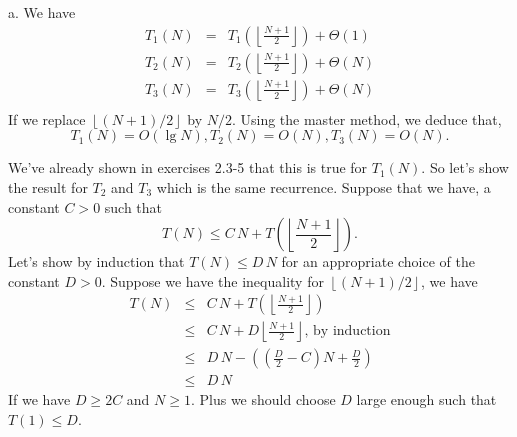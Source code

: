 \documentclass[a4paper,12pt]{article}
\newcommand{\subpar}[1]{\medskip \noindent #1.}
\begin{document}
\subpar{a}  We have
\begin{eqnarray*}
 T_1(N) &=& T_1\left(\left\lfloor \frac{N+1}{2}\right\rfloor\right) +
\Theta(1) \\
 T_2(N) &=& T_2\left(\left\lfloor \frac{N+1}{2}\right\rfloor\right) +
\Theta(N) \\
 T_3(N) &=& T_3\left(\left\lfloor \frac{N+1}{2}\right\rfloor\right) +
\Theta(N) \\
\end{eqnarray*}
If we replace $\left\lfloor (N+1)/2\right\rfloor$ by $N/2$.  Using the
master method, we deduce that,
\[ T_1(N) = O(\lg N), T_2(N) = O(N), T_3(N) = O(N).\]

We've already shown in exercises 2.3-5 that this is true for
$T_1(N)$.  So let's show the result for $T_2$ and $T_3$ which is the
same recurrence.  Suppose that we have, a constant $C > 0$ such that
\[ T(N) \le C\,N +
T\left(\left\lfloor\frac{N+1}{2}\right\rfloor\right).\]
Let's show by induction that $T(N) \le D\,N$ for an appropriate choice
of the constant $D > 0$.  Suppose we have the inequality for
$\left\lfloor(N+1)/2\right\rfloor$, we have
\begin{eqnarray*}
  T(N) &\le& C\,N + T\left(\left\lfloor \frac{N+1}{2}\right
  \rfloor\right) \\
  &\le& C\,N + D\left\lfloor\frac{N+1}{2}\right\rfloor,\,\mbox{by
    induction} \\
  &\le& D\,N - \left(\left(\frac{D}{2} - C\right)N +
  \frac{D}{2}\right) \\
  &\le& D\,N
\end{eqnarray*}
If we have $D \ge 2C$ and $N \ge 1$.  Plus we should choose $D$ large
enough such that $T(1) \le D$.
\end{document}
